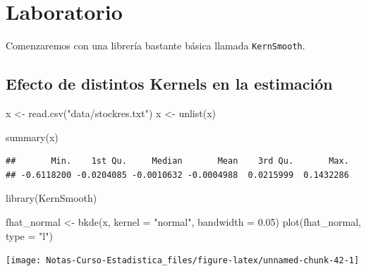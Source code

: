 \documentclass[
  12pt,
]{book}
\newenvironment{Shaded}{\begin{snugshade}}{\end{snugshade}}
\newcommand{\AttributeTok}[1]{\textcolor[rgb]{0.77,0.63,0.00}{#1}}
\newcommand{\FloatTok}[1]{\textcolor[rgb]{0.00,0.00,0.81}{#1}}
\newcommand{\FunctionTok}[1]{\textcolor[rgb]{0.00,0.00,0.00}{#1}}
\newcommand{\NormalTok}[1]{#1}
\newcommand{\OtherTok}[1]{\textcolor[rgb]{0.56,0.35,0.01}{#1}}
\newcommand{\StringTok}[1]{\textcolor[rgb]{0.31,0.60,0.02}{#1}}
\theoremstyle{definition}
\theoremstyle{definition}
\theoremstyle{definition}
\theoremstyle{remark}
\begin{document}
\hypertarget{laboratorio}{%
\section{Laboratorio}\label{laboratorio}}

Comenzaremos con una librería bastante básica llamada \texttt{KernSmooth}.

\hypertarget{efecto-de-distintos-kernels-en-la-estimaciuxf3n}{%
\subsection{Efecto de distintos Kernels en la estimación}\label{efecto-de-distintos-kernels-en-la-estimaciuxf3n}}

\begin{Shaded}
\begin{Highlighting}[]
\NormalTok{x }\OtherTok{\textless{}{-}} \FunctionTok{read.csv}\NormalTok{(}\StringTok{"data/stockres.txt"}\NormalTok{)}
\NormalTok{x }\OtherTok{\textless{}{-}} \FunctionTok{unlist}\NormalTok{(x)}
\end{Highlighting}
\end{Shaded}

\begin{Shaded}
\begin{Highlighting}[]
\FunctionTok{summary}\NormalTok{(x)}
\end{Highlighting}
\end{Shaded}

\begin{verbatim}
##       Min.    1st Qu.     Median       Mean    3rd Qu.       Max. 
## -0.6118200 -0.0204085 -0.0010632 -0.0004988  0.0215999  0.1432286
\end{verbatim}

\begin{Shaded}
\begin{Highlighting}[]
\FunctionTok{library}\NormalTok{(KernSmooth)}

\NormalTok{fhat\_normal }\OtherTok{\textless{}{-}} \FunctionTok{bkde}\NormalTok{(x, }\AttributeTok{kernel =} \StringTok{"normal"}\NormalTok{, }\AttributeTok{bandwidth =} \FloatTok{0.05}\NormalTok{)}
\FunctionTok{plot}\NormalTok{(fhat\_normal, }\AttributeTok{type =} \StringTok{"l"}\NormalTok{)}
\end{Highlighting}
\end{Shaded}

\begin{center}\texttt{[image: Notas-Curso-Estadistica\_files/figure-latex/unnamed-chunk-42-1]} \end{center}
\end{document}
